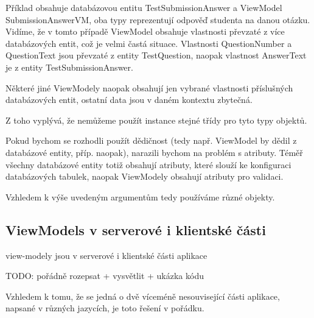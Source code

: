 Příklad obsahuje databázovou entitu TestSubmissionAnswer a ViewModel SubmissionAnswerVM, oba typy reprezentují odpověď studenta na danou otázku.
Vidíme, že v tomto případě ViewModel obsahuje vlastnosti převzaté z více databázových entit, což je velmi častá situace. Vlastnosti QuestionNumber a QuestionText jsou převzaté z entity TestQuestion, naopak vlastnost AnswerText je z entity TestSubmissionAnswer.

Některé jiné ViewModely naopak obsahují jen vybrané vlastnosti příslušných databázových entit, ostatní data jsou v daném kontextu zbytečná.

Z toho vyplývá, že nemůžeme použít instance stejné třídy pro tyto typy objektů.

Pokud bychom se rozhodli použít dědičnost (tedy např. ViewModel by dědil z databázové entity, příp. naopak), narazili bychom na problém s atributy.
Téměř všechny databázové entity totiž obsahují atributy, které slouží ke konfiguraci databázových tabulek, naopak ViewModely obsahují atributy pro validaci. 

Vzhledem k výše uvedeným argumentům tedy používáme různé objekty.


\subsection{ViewModels v serverové i klientské části}

view-modely jsou v serverové i klientské části aplikace

TODO: pořádně rozepsat + vysvětlit + ukázka kódu

Vzhledem k tomu, že se jedná o dvě víceméně nesouvisející části aplikace, napsané v různých jazycích, je toto řešení v pořádku.

